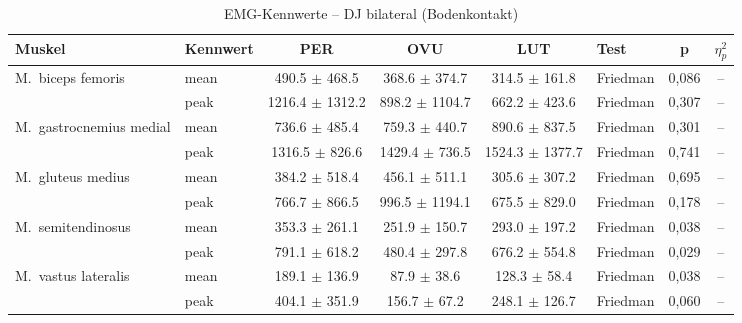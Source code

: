 \begin{table}[H]
  \centering
  \caption{EMG-Kennwerte – DJ bilateral (Bodenkontakt)}
  \label{tab:DJ_bilateral_Bodenkontakt}
  \small
  \begin{tabular}{l l c c c l c c}
    \hline
    \textbf{Muskel} & \textbf{Kennwert} & \textbf{PER} & \textbf{OVU} & \textbf{LUT} & \textbf{Test} & \textbf{p} & \textbf{$\eta^2_p$} \\
    \hline
    M.~biceps femoris & mean & 490.5 $\pm$ 468.5 & 368.6 $\pm$ 374.7 & 314.5 $\pm$ 161.8 & Friedman & 0{,}086 & -- \\
     & peak & 1216.4 $\pm$ 1312.2 & 898.2 $\pm$ 1104.7 & 662.2 $\pm$ 423.6 & Friedman & 0{,}307 & -- \\
    \hline
    M.~gastrocnemius medial & mean & 736.6 $\pm$ 485.4 & 759.3 $\pm$ 440.7 & 890.6 $\pm$ 837.5 & Friedman & 0{,}301 & -- \\
     & peak & 1316.5 $\pm$ 826.6 & 1429.4 $\pm$ 736.5 & 1524.3 $\pm$ 1377.7 & Friedman & 0{,}741 & -- \\
    \hline
    M.~gluteus medius & mean & 384.2 $\pm$ 518.4 & 456.1 $\pm$ 511.1 & 305.6 $\pm$ 307.2 & Friedman & 0{,}695 & -- \\
     & peak & 766.7 $\pm$ 866.5 & 996.5 $\pm$ 1194.1 & 675.5 $\pm$ 829.0 & Friedman & 0{,}178 & -- \\
    \hline
    M.~semitendinosus & mean & 353.3 $\pm$ 261.1 & 251.9 $\pm$ 150.7 & 293.0 $\pm$ 197.2 & Friedman & 0{,}038 & -- \\
     & peak & 791.1 $\pm$ 618.2 & 480.4 $\pm$ 297.8 & 676.2 $\pm$ 554.8 & Friedman & 0{,}029 & -- \\
    \hline
    M.~vastus lateralis & mean & 189.1 $\pm$ 136.9 & 87.9 $\pm$ 38.6 & 128.3 $\pm$ 58.4 & Friedman & 0{,}038 & -- \\
     & peak & 404.1 $\pm$ 351.9 & 156.7 $\pm$ 67.2 & 248.1 $\pm$ 126.7 & Friedman & 0{,}060 & -- \\
    \hline
  \end{tabular}
\end{table}

